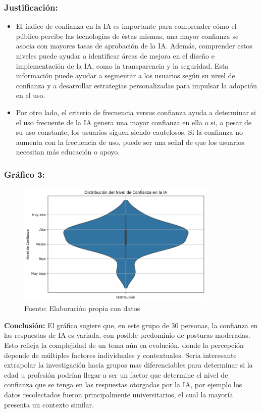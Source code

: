 \documentclass[12pt, a4paper]{article}
\begin{document}
\subsubsection*{Justificación: }

\begin{itemize}
    \item El índice de confianza en la IA es importante para comprender cómo el público percibe las tecnologías de éstas mismas, una mayor confianza se asocia con mayores tasas de aprobación de la IA. Además, 
    comprender estos niveles puede ayudar a identificar áreas de mejora en el diseño e implementación de la IA, como la transparencia y la seguridad. 
    Esta información puede ayudar a segmentar a los usuarios según su nivel de confianza y a desarrollar estrategias personalizadas para impulsar la adopción en el uso.
    \item Por otro lado, el criterio de frecuencia versus confianza ayuda a determinar si el uso frecuente de la IA genera una mayor confianza en ella o si, a pesar de su uso constante, los usuarios siguen siendo cautelosos. 
    Si la confianza no aumenta con la frecuencia de uso, puede ser una señal de que los usuarios necesitan más educación o apoyo.
\end{itemize}


\subsubsection*{Gráfico 3: }
\begin{figure}[H]
    \centering
    \includegraphics[width=0.85\textwidth]{Graficos/beeswarn.png}
    \caption[3]{Fuente: Elaboración propia con datos}
\end{figure}

\newpage
\textbf{Conclusión:}  
El gráfico sugiere que, en este grupo de 30 personas, la confianza en las respuestas de IA es variada, con posible predominio de posturas moderadas. Esto refleja la complejidad de un tema aún en evolución, 
donde la percepción depende de múltiples factores individuales y contextuales. Seria interesante extrapolar la investigación hacia grupos mas diferenciables para determinar si la edad u profesión podrían llegar a ser un
factor que determine el nivel de confianza que se tenga en las respuestas otorgadas por la IA, por ejemplo los datos recolectados fueron principalmente universitarios, el cual la mayoría presenta un contexto similar.
\end{document}
